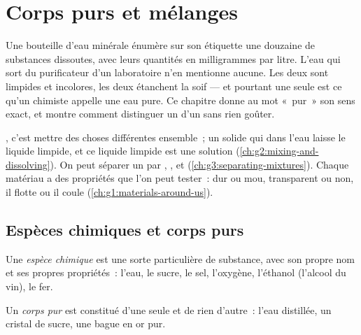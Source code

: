 \chapter{Corps purs et mélanges}\label{ch:g6:pure-substances-and-mixtures}

Une bouteille d'eau minérale énumère sur son étiquette une douzaine de
substances dissoutes, avec leurs quantités en milligrammes par litre.
L'eau qui sort du purificateur d'un laboratoire n'en mentionne aucune.
Les deux sont limpides et incolores, les deux étanchent la soif --- et
pourtant une seule est ce qu'un chimiste appelle une eau pure. Ce
chapitre donne au mot «~pur~» son sens exact, et montre comment
distinguer un  d'un  sans rien goûter.

\begin{recall}
, c'est mettre des choses différentes ensemble~; un solide qui
 dans l'eau laisse le liquide limpide, et ce liquide limpide
est une solution (\cref{ch:g2:mixing-and-dissolving}). On peut séparer
un  par , ,  et 
(\cref{ch:g3:separating-mixtures}). Chaque matériau a des propriétés que
l'on peut tester~: dur ou mou, transparent ou non, il flotte ou il coule
(\cref{ch:g1:materials-around-us}).
\end{recall}

\section{Espèces chimiques et corps purs}

\begin{definition}\label{def:g6:pure-substances-and-mixtures:species}
Une \emph{espèce chimique} est une sorte
particulière de substance, avec son propre nom et ses propres
propriétés~: l'eau, le sucre, le sel, l'oxygène, l'éthanol (l'alcool du
vin), le fer.
\end{definition}

\begin{definition}\label{def:g6:pure-substances-and-mixtures:pure-substance}
Un \emph{corps pur} est constitué d'une seule  et de rien d'autre~: l'eau distillée, un cristal de sucre, une
bague en or pur.
\end{definition}


